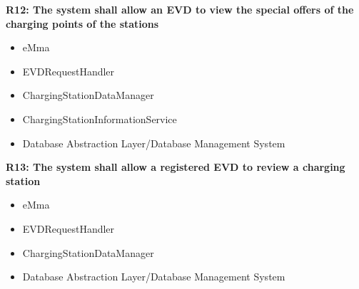\textbf{R12: The system shall allow an EVD to view the special offers of the charging points of the stations}
\begin{itemize}
	\item eMma
	\item EVDRequestHandler
	\item ChargingStationDataManager
    \item ChargingStationInformationService
	\item Database Abstraction Layer/Database Management System
\end{itemize}

\textbf{R13: The system shall allow a registered EVD to review a charging station}
\begin{itemize}
	\item eMma
	\item EVDRequestHandler
	\item ChargingStationDataManager
	\item Database Abstraction Layer/Database Management System
\end{itemize}

